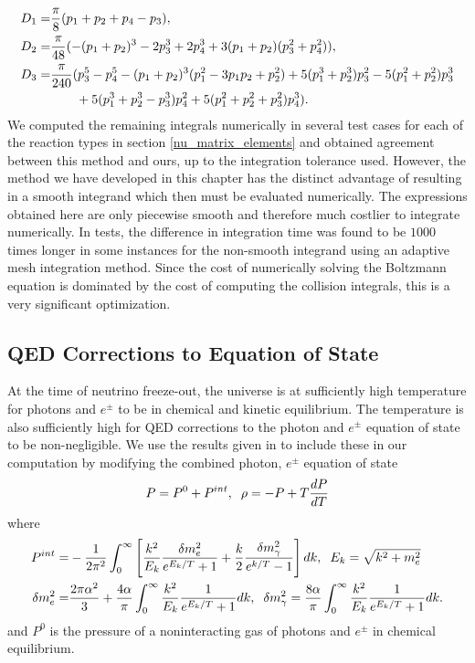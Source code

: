 \begin{align}
D_1=&\frac{\pi}{8}(p_1+p_2+p_4-p_3),\\
D_2=&\frac{\pi}{48}(-(p_1+p_2)^3-2p_3^3+2p_4^3+3(p_1+p_2)(p_3^2+p_4^2)),\\
D_3=&\frac{\pi}{240}(p_3^5-p_4^5-(p_1+p_2)^3(p_1^2-3p_1p_2+p_2^2)+5(p_1^3+p_2^3)p_3^2-5(p_1^2+p_2^2)p_3^3\\
&\hspace{7mm}+5(p_1^3+p_2^3-p_3^3)p_4^2+5(p_1^2+p_2^2+p_3^2)p_4^3).\notag
\end{align}
We computed the remaining integrals numerically in several test cases for each of the reaction types in section \ref{nu_matrix_elements} and obtained agreement between this method and ours, up to the integration tolerance used.  However, the method we have developed in this chapter has the distinct advantage of resulting in a smooth integrand which then must be evaluated numerically.  The expressions obtained here are only piecewise smooth and therefore much costlier to integrate numerically.  In tests, the difference in integration time was found to be $1000$ times longer in some instances for the non-smooth integrand using an adaptive mesh integration method.  Since the cost of numerically solving the Boltzmann equation is dominated by the cost of computing the collision integrals, this is a very significant optimization.

\subsection{QED Corrections to Equation of State}\label{app:QED_corr}
At the time of neutrino freeze-out, the universe is at sufficiently high temperature for photons and $e^\pm$ to be in chemical and kinetic equilibrium.  The temperature is also sufficiently high for QED corrections to the photon and $e^\pm$ equation of state to be non-negligible.  We use the results given in \cite{Heckler:1994tv,Mangano2002} to include these in our computation by modifying the combined photon, $e^\pm$ equation of state
\begin{align}
P=P^0+P^{int},\hspace{2mm} \rho=-P+T\frac{dP}{dT}
\end{align}
where
\begin{align}
P^{int}=&-\frac{1}{2\pi^2}\int_0^\infty\left[\frac{k^2}{E_k}\frac{\delta m_e^2}{e^{E_k/T}+1}+\frac{k}{2}\frac{\delta m_\gamma^2}{e^{k/T}-1}\right]dk,\hspace{2mm} E_k=\sqrt{k^2+m_e^2}\\
\delta m_e^2=&\frac{2\pi\alpha^2}{3}+\frac{4\alpha}{\pi}\int_0^\infty \frac{k^2}{E_k}\frac{1}{e^{E_k/T}+1}dk,\hspace{2mm} \delta m_\gamma^2=\frac{8\alpha}{\pi}\int_0^\infty \frac{k^2}{E_k}\frac{1}{e^{E_k/T}+1}dk.
\end{align}
and $P^0$ is the pressure of a noninteracting gas of photons and $e^\pm$ in chemical equilibrium.




